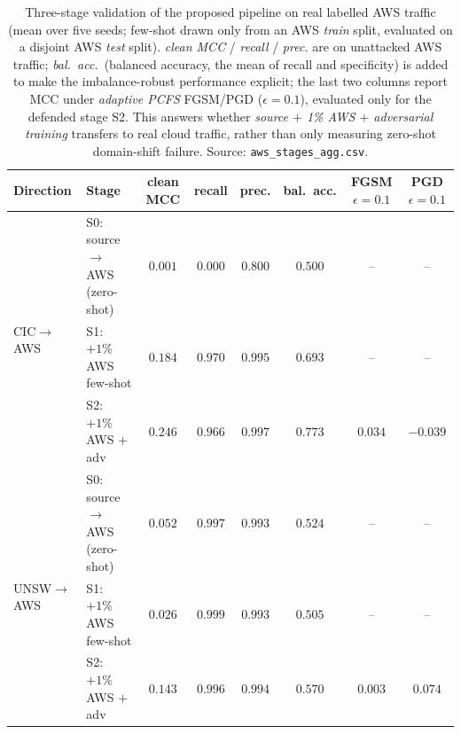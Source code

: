 \documentclass[preprint,12pt,authoryear]{elsarticle}
\begin{document}
\begin{table}[h]
\centering
\caption{Three-stage validation of the proposed pipeline on real labelled AWS traffic
(mean over five seeds; few-shot drawn only from an AWS \emph{train} split, evaluated
on a disjoint AWS \emph{test} split). \emph{clean MCC} / \emph{recall} / \emph{prec.}
are on unattacked AWS traffic; \emph{bal.\ acc.}\ (balanced accuracy, the mean of recall and specificity) is added to make the imbalance-robust performance explicit; the last two columns report MCC under \emph{adaptive
PCFS} FGSM/PGD ($\epsilon{=}0.1$), evaluated only for the defended stage S2. This
answers whether \emph{source $+$ 1\% AWS $+$ adversarial training} transfers to real
cloud traffic, rather than only measuring zero-shot domain-shift failure. Source:
\texttt{aws\_stages\_agg.csv}.}
\label{tab:aws_stages}
\small
\begin{tabular}{llcccccc}
\toprule
Direction & Stage & clean MCC & recall & prec. & bal.\ acc. & FGSM $\epsilon{=}0.1$ & PGD $\epsilon{=}0.1$ \\
\midrule
\multirow{3}{*}{CIC$\rightarrow$AWS}
 & S0: source$\rightarrow$AWS (zero-shot) & $0.001$ & $0.000$ & $0.800$ & $0.500$ & -- & -- \\
 & S1: $+1\%$ AWS few-shot                & $0.184$ & $0.970$ & $0.995$ & $0.693$ & -- & -- \\
 & S2: $+1\%$ AWS $+$ adv                 & $\mathbf{0.246}$ & $0.966$ & $0.997$ & $\mathbf{0.773}$ & $0.034$ & $-0.039$ \\
\midrule
\multirow{3}{*}{UNSW$\rightarrow$AWS}
 & S0: source$\rightarrow$AWS (zero-shot) & $0.052$ & $0.997$ & $0.993$ & $0.524$ & -- & -- \\
 & S1: $+1\%$ AWS few-shot                & $0.026$ & $0.999$ & $0.993$ & $0.505$ & -- & -- \\
 & S2: $+1\%$ AWS $+$ adv                 & $\mathbf{0.143}$ & $0.996$ & $0.994$ & $\mathbf{0.570}$ & $0.003$ & $0.074$ \\
\bottomrule
\end{tabular}
\end{table}
\end{document}

